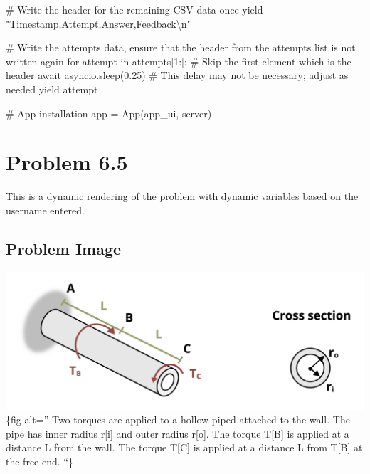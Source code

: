 \documentclass[
  letterpaper,
  DIV=11,
  numbers=noendperiod]{scrreprt}
\newenvironment{Shaded}{\begin{snugshade}}{\end{snugshade}}
\newcommand{\NormalTok}[1]{\textcolor[rgb]{0.00,0.23,0.31}{#1}}
\begin{document}
\begin{Shaded}
\begin{Highlighting}[]
\NormalTok{        \# Write the header for the remaining CSV data once}
\NormalTok{        yield "Timestamp,Attempt,Answer,Feedback\textbackslash{}n"}
        
\NormalTok{        \# Write the attempts data, ensure that the header from the attempts list is not written again}
\NormalTok{        for attempt in attempts[1:]:  \# Skip the first element which is the header}
\NormalTok{            await asyncio.sleep(0.25)  \# This delay may not be necessary; adjust as needed}
\NormalTok{            yield attempt}


\NormalTok{\# App installation}
\NormalTok{app = App(app\_ui, server)}
\end{Highlighting}
\end{Shaded}

\chapter*{Problem 6.5}\label{problem-6.5}


This is a dynamic rendering of the problem with dynamic variables based
on the username entered.

\section*{Problem Image}\label{problem-image-63}


\includegraphics{images/278.png}\{fig-alt='' Two torques are applied to
a hollow piped attached to the wall. The pipe has inner radius r{[}i{]}
and outer radius r{[}o{]}. The torque T{[}B{]} is applied at a distance
L from the wall. The torque T{[}C{]} is applied at a distance L from
T{[}B{]} at the free end. ``\}
\end{document}
